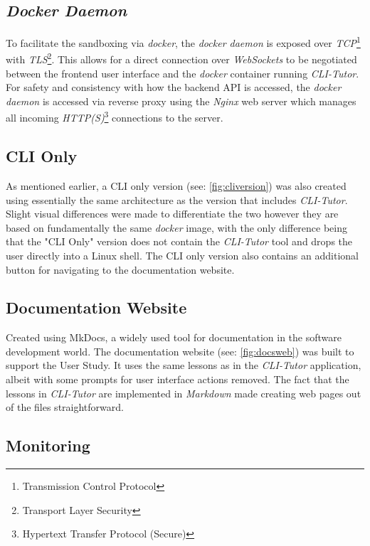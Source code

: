 \subsection{\textit{Docker Daemon}} To facilitate the sandboxing via
\textit{docker}, the \textit{docker daemon} is exposed over
\textit{TCP}\footnote{Transmission Control Protocol} with
\textit{TLS}\footnote{Transport Layer Security}. This allows for a direct
connection over \textit{WebSockets} to be negotiated between the frontend user
interface and the \textit{docker} container running \textit{CLI-Tutor}. For
safety and consistency with how the backend API is accessed, the \textit{docker
daemon} is accessed via reverse proxy using the \textit{Nginx} web server which
manages all incoming \textit{HTTP(S)}\footnote{Hypertext Transfer Protocol
(Secure)} connections to the server. 

 
\subsection{CLI Only} As mentioned earlier, a CLI only version (see:
\autoref{fig:cliversion}) was also created using essentially the same
architecture as the version that includes \textit{CLI-Tutor}. Slight visual
differences were made to differentiate the two however they are based on
fundamentally the same \textit{docker} image, with the only difference being
that the "CLI Only" version does not contain the \textit{CLI-Tutor} tool and
drops the user directly into a Linux shell. The CLI only version also contains
an additional button for navigating to the documentation website.

\subsection{Documentation Website} Created using MkDocs,\cite{mkdocs} a widely
used tool for documentation in the software development world. The
documentation website (see: \autoref{fig:docsweb}) was built to support the
User Study. It uses the same lessons as in the \textit{CLI-Tutor} application,
albeit with some prompts for user interface actions removed. The fact that the
lessons in \textit{CLI-Tutor} are implemented in \textit{Markdown} made
creating web pages out of the files straightforward.

\subsection{Monitoring}

